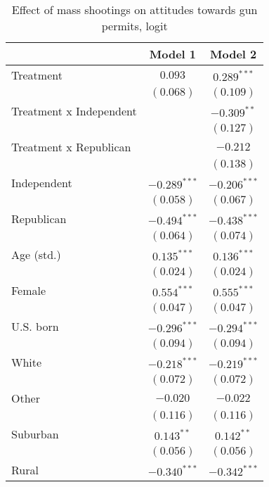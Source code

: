 
\begin{table}
\caption{Effect of mass shootings on attitudes towards gun permits, logit}
\begin{center}
\begin{tabular}{l c c}
\toprule
 & Model 1 & Model 2 \\
\midrule
Treatment               & $0.093$        & $0.289^{***}$  \\
                        & $(0.068)$      & $(0.109)$      \\
Treatment x Independent &                & $-0.309^{**}$  \\
                        &                & $(0.127)$      \\
Treatment x Republican  &                & $-0.212$       \\
                        &                & $(0.138)$      \\
Independent             & $-0.289^{***}$ & $-0.206^{***}$ \\
                        & $(0.058)$      & $(0.067)$      \\
Republican              & $-0.494^{***}$ & $-0.438^{***}$ \\
                        & $(0.064)$      & $(0.074)$      \\
Age (std.)              & $0.135^{***}$  & $0.136^{***}$  \\
                        & $(0.024)$      & $(0.024)$      \\
Female                  & $0.554^{***}$  & $0.555^{***}$  \\
                        & $(0.047)$      & $(0.047)$      \\
U.S. born               & $-0.296^{***}$ & $-0.294^{***}$ \\
                        & $(0.094)$      & $(0.094)$      \\
White                   & $-0.218^{***}$ & $-0.219^{***}$ \\
                        & $(0.072)$      & $(0.072)$      \\
Other                   & $-0.020$       & $-0.022$       \\
                        & $(0.116)$      & $(0.116)$      \\
Suburban                & $0.143^{**}$   & $0.142^{**}$   \\
                        & $(0.056)$      & $(0.056)$      \\
Rural                   & $-0.340^{***}$ & $-0.342^{***}$ \\

\end{tabular}
\end{center}
\end{table}
